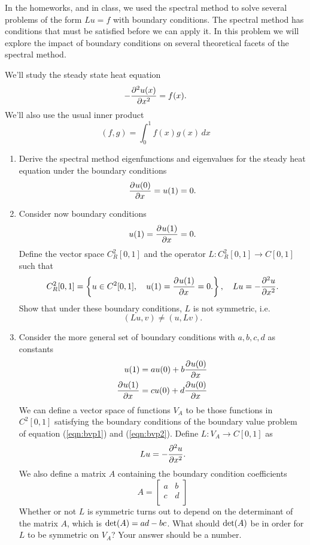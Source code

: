 In the homeworks, and in class, we used the spectral method to solve several problems of the form $Lu = f$ with boundary conditions.   The spectral method has conditions that must be satisfied before we can apply it.  In this problem we will explore the impact of boundary conditions on several theoretical facets of the spectral method.

We'll study the steady state heat equation
\[
-\frac{\partial^{2} u(x)}{\partial x^{2}} = f(x).  
\]
We'll also use the usual inner product 
\[
(f,g) = \int_{0}^{1} f(x)g(x)\, dx
\]

\begin{enumerate}
\item Derive the spectral method eigenfunctions and eigenvalues for the steady heat equation under the boundary conditions
\[
\frac{\partial^{} u(0)}{\partial x^{}} = u(1) = 0.
\]
\item Consider now boundary conditions 
\[
u(1) =  \frac{\partial^{} u(1)}{\partial x^{}} = 0.
\]
Define the vector space $C^2_R[0,1]$ and the operator $L: C^2_R[0,1]\rightarrow C[0,1]$ such that 
\[
C^2_R[0,1] = \left\{ u\in C^2[0,1], \quad u(1)= \frac{\partial^{} u(1)}{\partial x^{}} = 0.\right\}, \quad Lu = -\frac{\partial^{2} u}{\partial x^{2}}.
\]
Show that under these boundary conditions, $L$ is not symmetric, i.e.
\[
(Lu,v) \neq (u,Lv).
\]
\item Consider the more general set of boundary conditions with $a,b,c,d$ as constants
\begin{align}
       u(1) &= a u(0) + b \frac{\partial^{} u(0)}{\partial x^{}}             \label{eqn:bvp1}\\
      \frac{\partial^{} u(1)}{\partial x^{}} &= c u(0) + d\frac{\partial^{} u(0)}{\partial x^{}}\label{eqn:bvp2}
\end{align}
We can define a vector space of functions $V_A$ to be those functions in $C^{2}[0,1]$ satisfying the boundary conditions of the boundary value problem of equation (\ref{eqn:bvp1}) and (\ref{eqn:bvp2}). %
 Define $L:V_A \rightarrow C[0,1]$ as 
\[
Lu = -\frac{\partial^{2} u}{\partial x^{2}}.
\]
We also define a matrix $A$ containing the boundary condition coefficients
\[
 A = \left[
     \begin{array}{cc}
       a & b \\
      c & d\\
     \end{array}
   \right]
\]
Whether or not $L$ is symmetric turns out to depend on the determinant of the matrix $A$, which is ${\rm det}(A) = ad - bc$.  What should ${\rm det}(A)$ be in order for $L$ to be symmetric on $V_A$? Your answer should be a number.


\end{enumerate}
